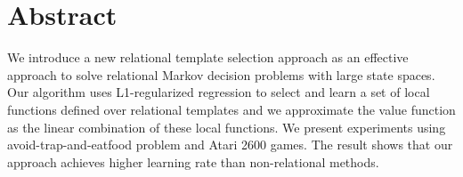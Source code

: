 
\chapter{Abstract}

We introduce a new relational template selection approach as 
an effective approach to solve relational Markov decision problems
with large state spaces. Our algorithm uses L1-regularized regression
to select and learn a set of local functions defined over relational templates
and we approximate the value function as the linear combination of these local
functions. We present experiments using avoid-trap-and-eatfood problem and Atari 2600 games.
The result shows that our approach achieves higher learning rate than non-relational methods.

\vfill
\begin{center}
\begin{sf}
\end{sf}
\end{center}
